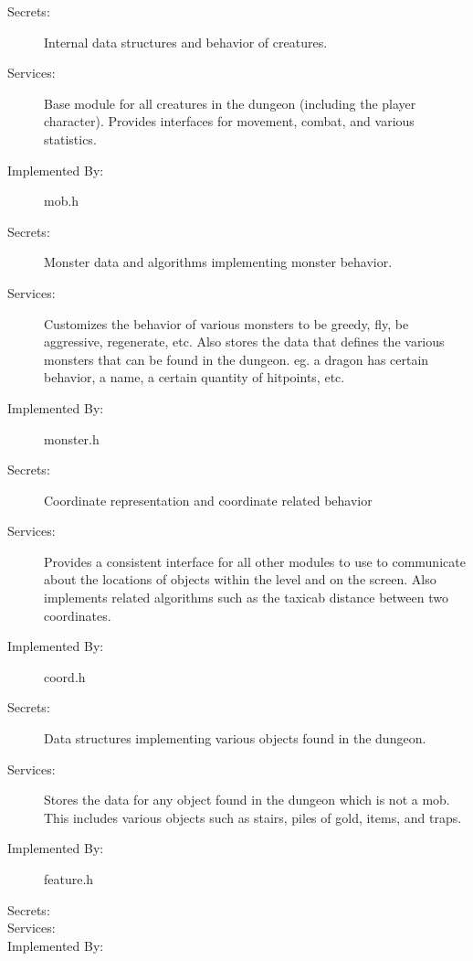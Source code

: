 \documentclass[12pt, titlepage]{article}
\begin{document}
\begin{description}
\item[Secrets:]Internal data structures and behavior of creatures.
\item[Services:]Base module for all creatures in the dungeon (including the player
character). Provides interfaces for movement, combat, and various statistics.
\item[Implemented By:]mob.h
\end{description}

\begin{description}
\item[Secrets:]Monster data and algorithms implementing monster behavior.
\item[Services:]Customizes the behavior of various monsters to be greedy, fly,
be aggressive, regenerate, etc. Also stores the data that defines the various monsters
that can be found in the dungeon. eg. a dragon has certain behavior, a name, a certain
quantity of hitpoints, etc.
\item[Implemented By:]monster.h
\end{description}

\begin{description}
\item[Secrets:]Coordinate representation and coordinate related behavior
\item[Services:]Provides a consistent interface for all other modules to use
to communicate about the locations of objects within the level and on the screen.
Also implements related algorithms such as the taxicab distance between
two coordinates.
\item[Implemented By:]coord.h
\end{description}

\begin{description}
\item[Secrets:]Data structures implementing various objects found in the dungeon.
\item[Services:]Stores the data for any object found in the dungeon which is not a mob.
This includes various objects such as stairs, piles of gold, items, and traps.
\item[Implemented By:]feature.h
\end{description}

\begin{description}
\item[Secrets:]
\item[Services:]
\item[Implemented By:]
\end{description}
\end{document}
